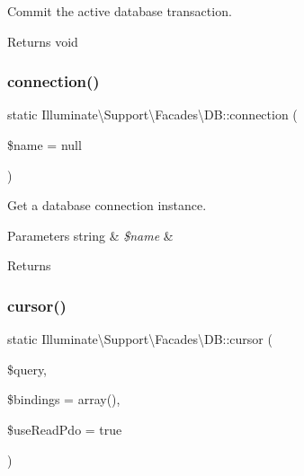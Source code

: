 Commit the active database transaction.

\begin{DoxyReturn}{Returns}
void 
\end{DoxyReturn}
\mbox{\label{class_illuminate_1_1_support_1_1_facades_1_1_d_b_af4c07501009e8ba9afb48a1521386349}} 
\subsubsection{\texorpdfstring{connection()}{connection()}}
{\footnotesize\ttfamily static Illuminate\textbackslash{}\+Support\textbackslash{}\+Facades\textbackslash{}\+D\+B\+::connection (\begin{DoxyParamCaption}\item[{}]{\$name = {\ttfamily null} }\end{DoxyParamCaption})\hspace{0.3cm}{\ttfamily [static]}}

Get a database connection instance.


\begin{DoxyParams}[1]{Parameters}
string & {\em \$name} & \\
\hline
\end{DoxyParams}
\begin{DoxyReturn}{Returns}

\end{DoxyReturn}
\mbox{\label{class_illuminate_1_1_support_1_1_facades_1_1_d_b_ab1ad06c52c19e7844542f8bfe41ef765}} 
\subsubsection{\texorpdfstring{cursor()}{cursor()}}
{\footnotesize\ttfamily static Illuminate\textbackslash{}\+Support\textbackslash{}\+Facades\textbackslash{}\+D\+B\+::cursor (\begin{DoxyParamCaption}\item[{}]{\$query,  }\item[{}]{\$bindings = {\ttfamily array()},  }\item[{}]{\$use\+Read\+Pdo = {\ttfamily true} }\end{DoxyParamCaption})\hspace{0.3cm}{\ttfamily [static]}}

